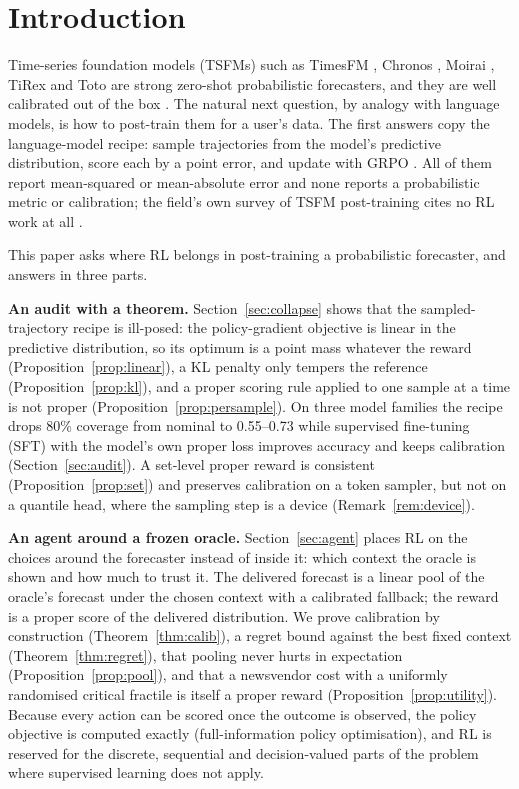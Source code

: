 \documentclass{article}
\begin{document}
\section{Introduction}
Time-series foundation models (TSFMs) such as TimesFM \citep{das2023timesfm}, Chronos \citep{ansari2024chronos,ansari2025chronos2}, Moirai \citep{woo2024moirai}, TiRex \citep{auer2025tirex} and Toto \citep{cohen2025toto} are strong zero-shot probabilistic forecasters, and they are well calibrated out of the box \citep{adler2026calibrated}. The natural next question, by analogy with language models, is how to post-train them for a user's data. The first answers \citep{qi2025timehf,li2026timerft,zhang2026gtnr} copy the language-model recipe: sample trajectories from the model's predictive distribution, score each by a point error, and update with GRPO \citep{shao2024deepseekmath}. All of them report mean-squared or mean-absolute error and none reports a probabilistic metric or calibration; the field's own survey of TSFM post-training cites no RL work at all \citep{xie2026survey}.

This paper asks where RL belongs in post-training a probabilistic forecaster, and answers in three parts.

\textbf{An audit with a theorem.} Section~\ref{sec:collapse} shows that the sampled-trajectory recipe is ill-posed: the policy-gradient objective is linear in the predictive distribution, so its optimum is a point mass whatever the reward (Proposition~\ref{prop:linear}), a KL penalty only tempers the reference (Proposition~\ref{prop:kl}), and a proper scoring rule applied to one sample at a time is not proper (Proposition~\ref{prop:persample}). On three model families the recipe drops 80\% coverage from nominal to 0.55--0.73 while supervised fine-tuning (SFT) with the model's own proper loss improves accuracy and keeps calibration (Section~\ref{sec:audit}). A set-level proper reward is consistent (Proposition~\ref{prop:set}) and preserves calibration on a token sampler, but not on a quantile head, where the sampling step is a device (Remark~\ref{rem:device}).

\textbf{An agent around a frozen oracle.} Section~\ref{sec:agent} places RL on the choices around the forecaster instead of inside it: which context the oracle is shown and how much to trust it. The delivered forecast is a linear pool of the oracle's forecast under the chosen context with a calibrated fallback; the reward is a proper score of the delivered distribution. We prove calibration by construction (Theorem~\ref{thm:calib}), a regret bound against the best fixed context (Theorem~\ref{thm:regret}), that pooling never hurts in expectation (Proposition~\ref{prop:pool}), and that a newsvendor cost with a uniformly randomised critical fractile is itself a proper reward (Proposition~\ref{prop:utility}). Because every action can be scored once the outcome is observed, the policy objective is computed exactly (full-information policy optimisation), and RL is reserved for the discrete, sequential and decision-valued parts of the problem where supervised learning does not apply.
\end{document}

